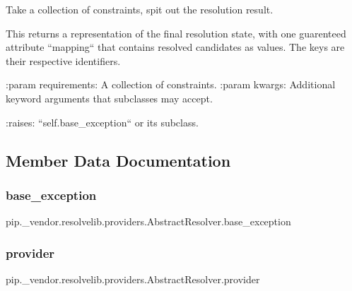 \begin{DoxyVerb}Take a collection of constraints, spit out the resolution result.

This returns a representation of the final resolution state, with one
guarenteed attribute ``mapping`` that contains resolved candidates as
values. The keys are their respective identifiers.

:param requirements: A collection of constraints.
:param kwargs: Additional keyword arguments that subclasses may accept.

:raises: ``self.base_exception`` or its subclass.
\end{DoxyVerb}
 

\subsection{Member Data Documentation}
\mbox{\label{classpip_1_1__vendor_1_1resolvelib_1_1providers_1_1AbstractResolver_a3dc432d83712f4740860340a815715f7}} 
\subsubsection{\texorpdfstring{base\+\_\+exception}{base\_exception}}
{\footnotesize\ttfamily pip.\+\_\+vendor.\+resolvelib.\+providers.\+Abstract\+Resolver.\+base\+\_\+exception\hspace{0.3cm}{\ttfamily [static]}}

\mbox{\label{classpip_1_1__vendor_1_1resolvelib_1_1providers_1_1AbstractResolver_a149d96dde7301b4b17321db453730ca1}} 
\subsubsection{\texorpdfstring{provider}{provider}}
{\footnotesize\ttfamily pip.\+\_\+vendor.\+resolvelib.\+providers.\+Abstract\+Resolver.\+provider}

